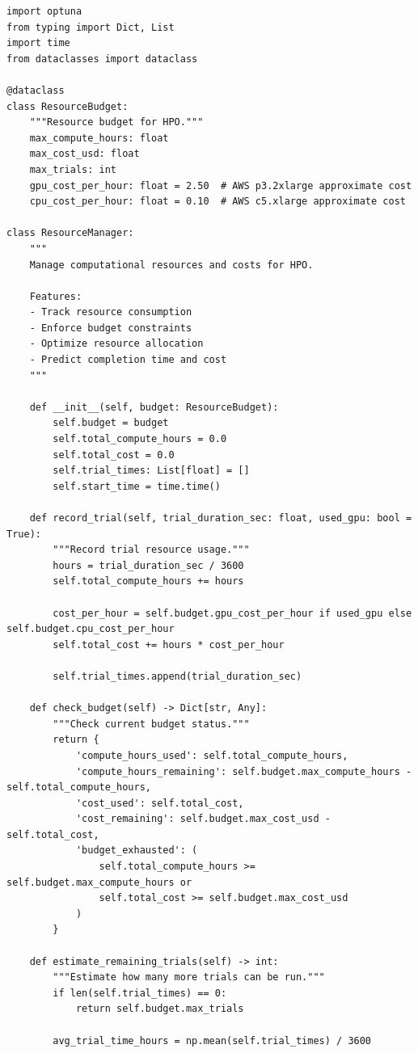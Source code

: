 \begin{lstlisting}[style=python, caption=Resource management for cost-effective HPO]
import optuna
from typing import Dict, List
import time
from dataclasses import dataclass

@dataclass
class ResourceBudget:
    """Resource budget for HPO."""
    max_compute_hours: float
    max_cost_usd: float
    max_trials: int
    gpu_cost_per_hour: float = 2.50  # AWS p3.2xlarge approximate cost
    cpu_cost_per_hour: float = 0.10  # AWS c5.xlarge approximate cost

class ResourceManager:
    """
    Manage computational resources and costs for HPO.

    Features:
    - Track resource consumption
    - Enforce budget constraints
    - Optimize resource allocation
    - Predict completion time and cost
    """

    def __init__(self, budget: ResourceBudget):
        self.budget = budget
        self.total_compute_hours = 0.0
        self.total_cost = 0.0
        self.trial_times: List[float] = []
        self.start_time = time.time()

    def record_trial(self, trial_duration_sec: float, used_gpu: bool = True):
        """Record trial resource usage."""
        hours = trial_duration_sec / 3600
        self.total_compute_hours += hours

        cost_per_hour = self.budget.gpu_cost_per_hour if used_gpu else self.budget.cpu_cost_per_hour
        self.total_cost += hours * cost_per_hour

        self.trial_times.append(trial_duration_sec)

    def check_budget(self) -> Dict[str, Any]:
        """Check current budget status."""
        return {
            'compute_hours_used': self.total_compute_hours,
            'compute_hours_remaining': self.budget.max_compute_hours - self.total_compute_hours,
            'cost_used': self.total_cost,
            'cost_remaining': self.budget.max_cost_usd - self.total_cost,
            'budget_exhausted': (
                self.total_compute_hours >= self.budget.max_compute_hours or
                self.total_cost >= self.budget.max_cost_usd
            )
        }

    def estimate_remaining_trials(self) -> int:
        """Estimate how many more trials can be run."""
        if len(self.trial_times) == 0:
            return self.budget.max_trials

        avg_trial_time_hours = np.mean(self.trial_times) / 3600


\end{lstlisting}

